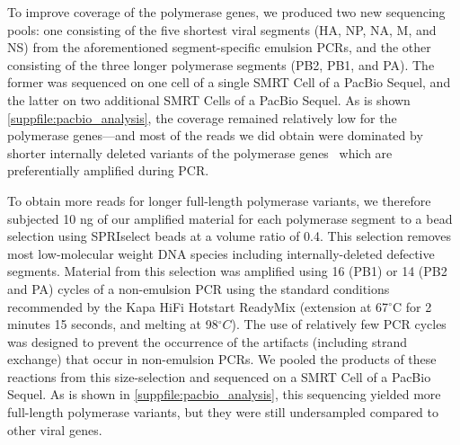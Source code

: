 \documentclass[]{asm-article}
\newcommand{\SUPPFILE}[1]{\autoref{suppfile:#1}}
\begin{document}
To improve coverage of the polymerase genes, we produced two new sequencing pools: one consisting of the five shortest viral segments (HA, NP, NA, M, and NS) from the aforementioned segment-specific emulsion PCRs, and the other consisting of the three longer polymerase segments (PB2, PB1, and PA).
The former was sequenced on one cell of a single SMRT Cell of a PacBio Sequel, and the latter on two additional SMRT Cells of a PacBio Sequel. 
As is shown \SUPPFILE{pacbio_analysis}, the coverage remained relatively low for the polymerase genes---and most of the reads we did obtain were dominated by shorter internally deleted variants of the polymerase genes~\cite{xue2016propagation} which are preferentially amplified during PCR.

To obtain more reads for longer full-length polymerase variants, we therefore subjected 10 ng of our amplified material for each polymerase segment to a bead selection using SPRIselect beads at a volume ratio of 0.4. 
This selection removes most low-molecular weight DNA species including internally-deleted defective segments.
Material from this selection was amplified using 16 (PB1) or 14 (PB2 and PA) cycles of a non-emulsion PCR using the standard conditions recommended by the Kapa HiFi Hotstart ReadyMix (extension at 67$^{\circ}$C for 2 minutes 15 seconds, and melting at 98$^{\circ}C$).
The use of relatively few PCR cycles was designed to prevent the occurrence of the artifacts (including strand exchange) that occur in non-emulsion PCRs.
We pooled the products of these reactions from this size-selection and sequenced on a SMRT Cell of a PacBio Sequel.
As is shown in \SUPPFILE{pacbio_analysis}, this sequencing yielded more full-length polymerase variants, but they were still undersampled compared to other viral genes.
\end{document}
